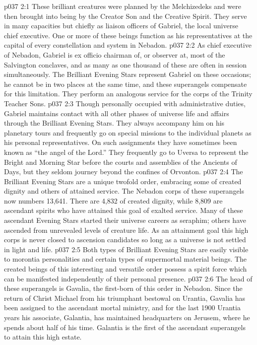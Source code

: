 \vs p037 2:1 These brilliant creatures were planned by the Melchizedeks and were then brought into being by the Creator Son and the Creative Spirit. They serve in many capacities but chiefly as liaison officers of Gabriel, the local universe chief executive. One or more of these beings function as his representatives at the capital of every constellation and system in Nebadon.
\vs p037 2:2 As chief executive of Nebadon, Gabriel is ex officio chairman of, or observer at, most of the Salvington conclaves, and as many as one thousand of these are often in session simultaneously. The Brilliant Evening Stars represent Gabriel on these occasions; he cannot be in two places at the same time, and these superangels compensate for this limitation. They perform an analogous service for the corps of the Trinity Teacher Sons.
\vs p037 2:3 Though personally occupied with administrative duties, Gabriel maintains contact with all other phases of universe life and affairs through the Brilliant Evening Stars. They always accompany him on his planetary tours and frequently go on special missions to the individual planets as his personal representatives. On such assignments they have sometimes been known as “the angel of the Lord.” They frequently go to Uversa to represent the Bright and Morning Star before the courts and assemblies of the Ancients of Days, but they seldom journey beyond the confines of Orvonton.
\vs p037 2:4 \pc The Brilliant Evening Stars are a unique twofold order, embracing some of created dignity and others of attained service. The Nebadon corps of these superangels now numbers 13,641. There are 4,832 of created dignity, while 8,809 are ascendant spirits who have attained this goal of exalted service. Many of these ascendant Evening Stars started their universe careers as seraphim; others have ascended from unrevealed levels of creature life. As an attainment goal this high corps is never closed to ascension candidates so long as a universe is not settled in light and life.
\vs p037 2:5 Both types of Brilliant Evening Stars are easily visible to morontia personalities and certain types of supermortal material beings. The created beings of this interesting and versatile order possess a spirit force which can be manifested independently of their personal presence.
\vs p037 2:6 \pc The head of these superangels is Gavalia, the first\hyp{}born of this order in Nebadon. Since the return of Christ Michael from his triumphant bestowal on Urantia, Gavalia has been assigned to the ascendant mortal ministry, and for the last 1900 Urantia years his associate, Galantia, has maintained headquarters on Jerusem, where he spends about half of his time. Galantia is the first of the ascendant superangels to attain this high estate.
